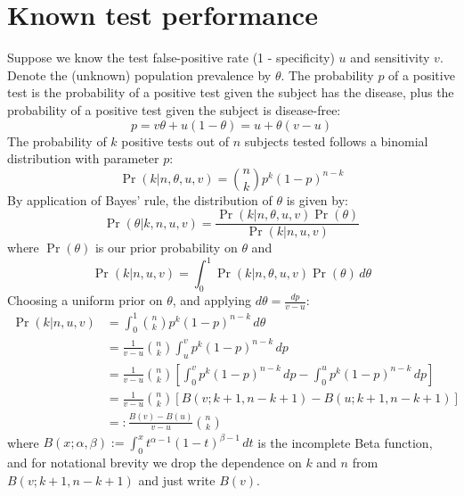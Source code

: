 \documentclass[dvipdfmx]{article}
\begin{document}
\section{Known test performance}
Suppose we know the test false-positive rate (1 - specificity) $u$ and
sensitivity $v$. Denote the (unknown) population prevalence by
$\theta$. The probability $p$ of a positive test is the probability of
a positive test given the subject has the disease, plus the
probability of a positive test given the subject is disease-free:
\begin{equation}
  \label{eq:p}
  p = v\theta + u(1-\theta) = u + \theta(v-u)
\end{equation}
The probability of $k$ positive tests out of $n$ subjects tested
follows a binomial distribution with parameter $p$:
\begin{equation}
  \label{eq:bin_p}
  \Pr\left(k|n,\theta,u,v\right) = {n \choose k} p^k(1-p)^{n-k}
\end{equation}
By application of Bayes' rule, the distribution of $\theta$ is given by:
\begin{equation}
  \label{eq:p_theta}
  \Pr\left(\theta|k,n,u,v\right) = \frac{\Pr\left(k|n,\theta,u,v\right)\Pr(\theta)}{\Pr\left(k|n,u,v\right)}
\end{equation}
where $\Pr(\theta)$ is our prior probability on $\theta$ and
\begin{equation}
  \label{eq:p_k}
  \Pr\left(k|n,u,v\right) = \int_0^1\Pr\left(k|n,\theta,u,v\right)\Pr(\theta)\,d\theta
\end{equation}
Choosing a uniform prior on $\theta$, and applying $d\theta = \frac{dp}{v-u}$:
\begin{align}
\Pr\left(k|n,u,v\right) \nonumber
&= \int_0^1 {n \choose k} p^k(1-p)^{n-k}\,d\theta \\\nonumber
   &= \frac{1}{v-u}{n \choose k}\int_u^v p^k(1-p)^{n-k}\,dp \\\nonumber
   &= \frac{1}{v-u}{n \choose k}\left[\int_0^v p^k(1-p)^{n-k}\,dp - \int_0^u p^k(1-p)^{n-k}\,dp\right] \\\nonumber
   &= \frac{1}{v-u}{n \choose k}\left[B(v;k+1,n-k+1) - B(u;k+1,n-k+1)\right] \\
&=:\frac{B(v) - B(u)}{v-u}{n \choose k}\label{eq:k_prior}
\end{align}
where $B(x;\alpha,\beta) := \int_0^x t^{\alpha-1}(1-t)^{\beta-1}\, dt$
is the incomplete Beta function, and for notational brevity we drop
the dependence on $k$ and $n$ from $B(v;k+1,n-k+1)$ and just write
$B(v)$.
\end{document}
